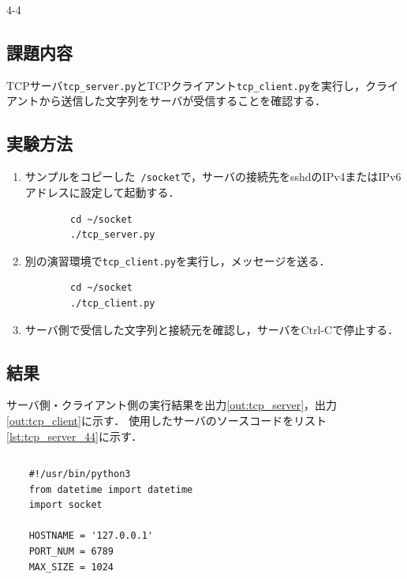 \begin{maintask}{4-4}
  \subsection*{課題内容}
  TCPサーバ\texttt{tcp\_server.py}とTCPクライアント\texttt{tcp\_client.py}を実行し，クライアントから送信した文字列をサーバが受信することを確認する．

  \subsection*{実験方法}
  \begin{enumerate}
    \item サンプルをコピーした\texttt{~/socket}で，サーバの接続先をsshdのIPv4またはIPv6アドレスに設定して起動する．
      \begin{verbatim}
        cd ~/socket
        ./tcp_server.py
      \end{verbatim}
    \item 別の演習環境で\texttt{tcp\_client.py}を実行し，メッセージを送る．
      \begin{verbatim}
        cd ~/socket
        ./tcp_client.py
      \end{verbatim}
    \item サーバ側で受信した文字列と接続元を確認し，サーバをCtrl-Cで停止する．
  \end{enumerate}

  \subsection*{結果}
  サーバ側・クライアント側の実行結果を出力\ref{out:tcp_server}，出力\ref{out:tcp_client}に示す．
  使用したサーバのソースコードをリスト\ref{lst:tcp_server_44}に示す．
  \begin{listing}[H]
    \caption{tcp\_server.py のソースコード}\label{lst:tcp_server_44}
    \inputminted[fontsize=\small]{python}{src/day4/tcp_server.py}
  \end{listing}
  \begin{listing}[H]
    \caption{4-4で使用したIPv4版tcp\_client.py}\label{lst:tcp_client_44}
    \begin{verbatim}
    #!/usr/bin/python3
    from datetime import datetime
    import socket

    HOSTNAME = '127.0.0.1'
    PORT_NUM = 6789
    MAX_SIZE = 1024


\end{verbatim}
\end{listing}
\end{maintask}
